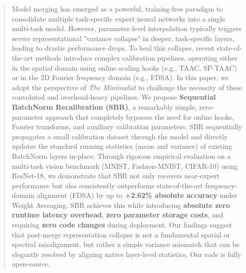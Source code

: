 \documentclass{article}
\theoremstyle{plain}
\theoremstyle{definition}
\theoremstyle{remark}
\begin{document}

\printAffiliationsAndNotice{}

\begin{abstract}
Model merging has emerged as a powerful, training-free paradigm to consolidate multiple task-specific expert neural networks into a single multi-task model. However, parameter-level interpolation typically triggers severe representational "variance collapse" in deeper, task-specific layers, leading to drastic performance drops. To heal this collapse, recent state-of-the-art methods introduce complex calibration pipelines, operating either in the spatial domain using online scaling hooks (e.g., TAAC, SP-TAAC) or in the 2D Fourier frequency domain (e.g., FDSA). In this paper, we adopt the perspective of \textit{The Minimalist} to challenge the necessity of these convoluted and overhead-heavy pipelines. We propose \textbf{Sequential BatchNorm Recalibration (SBR)}, a remarkably simple, zero-parameter approach that completely bypasses the need for online hooks, Fourier transforms, and auxiliary calibration parameters. SBR sequentially propagates a small calibration dataset through the model and directly updates the standard running statistics (mean and variance) of existing BatchNorm layers in-place. Through rigorous empirical evaluation on a multi-task vision benchmark (MNIST, Fashion-MNIST, CIFAR-10) using ResNet-18, we demonstrate that SBR not only recovers near-expert performance but also consistently outperforms state-of-the-art frequency-domain alignment (FDSA) by up to \textbf{+2.62\% absolute accuracy} under Weight Averaging. SBR achieves this while introducing \textbf{absolute zero runtime latency overhead}, \textbf{zero parameter storage costs}, and requiring \textbf{zero code changes} during deployment. Our findings suggest that post-merge representation collapse is not a fundamental spatial or spectral misalignment, but rather a simple variance mismatch that can be elegantly resolved by aligning native layer-level statistics. Our code is fully open-source.
\end{abstract}
\end{document}

